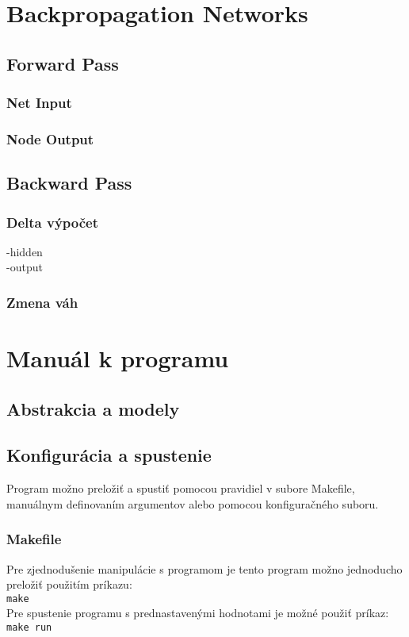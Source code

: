 \documentclass[a4paper, 11pt]{article}
\begin{document}
\section{Backpropagation Networks}
\subsection{Forward Pass}
\subsubsection*{Net Input}
\subsubsection*{Node Output}
\subsection{Backward Pass}
\subsubsection*{Delta výpočet}
	-hidden\\
	-output
\subsubsection*{Zmena váh}
\section{Manuál k programu}
\subsection{Abstrakcia a modely}
\subsection{Konfigurácia a spustenie}
Program možno preložiť a spustiť pomocou pravidiel v subore Makefile, manuálnym definovaním argumentov alebo pomocou konfiguračného suboru.
\subsubsection*{Makefile}
Pre zjednodušenie manipulácie s programom je tento program možno jednoducho preložiť použitím príkazu:\\
 \texttt{make}\\
 Pre spustenie programu s prednastavenými hodnotami je možné použiť príkaz:\\
 \texttt{make run}
\end{document}
